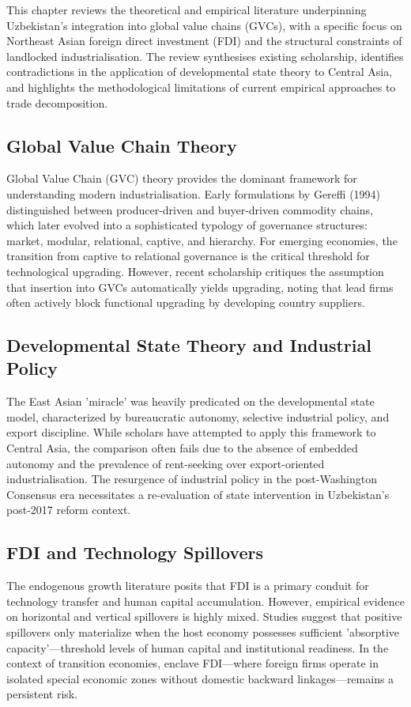 
This chapter reviews the theoretical and empirical literature underpinning Uzbekistan's integration into global value chains (GVCs), with a specific focus on Northeast Asian foreign direct investment (FDI) and the structural constraints of landlocked industrialisation. The review synthesises existing scholarship, identifies contradictions in the application of developmental state theory to Central Asia, and highlights the methodological limitations of current empirical approaches to trade decomposition.

\subsection{Global Value Chain Theory}
Global Value Chain (GVC) theory provides the dominant framework for understanding modern industrialisation. Early formulations by Gereffi (1994) distinguished between producer-driven and buyer-driven commodity chains, which later evolved into a sophisticated typology of governance structures: market, modular, relational, captive, and hierarchy. For emerging economies, the transition from captive to relational governance is the critical threshold for technological upgrading. However, recent scholarship critiques the assumption that insertion into GVCs automatically yields upgrading, noting that lead firms often actively block functional upgrading by developing country suppliers.

\subsection{Developmental State Theory and Industrial Policy}
The East Asian 'miracle' was heavily predicated on the developmental state model, characterized by bureaucratic autonomy, selective industrial policy, and export discipline. While scholars have attempted to apply this framework to Central Asia, the comparison often fails due to the absence of embedded autonomy and the prevalence of rent-seeking over export-oriented industrialisation. The resurgence of industrial policy in the post-Washington Consensus era necessitates a re-evaluation of state intervention in Uzbekistan's post-2017 reform context.

\subsection{FDI and Technology Spillovers}
The endogenous growth literature posits that FDI is a primary conduit for technology transfer and human capital accumulation. However, empirical evidence on horizontal and vertical spillovers is highly mixed. Studies suggest that positive spillovers only materialize when the host economy possesses sufficient 'absorptive capacity'—threshold levels of human capital and institutional readiness. In the context of transition economies, enclave FDI—where foreign firms operate in isolated special economic zones without domestic backward linkages—remains a persistent risk.

